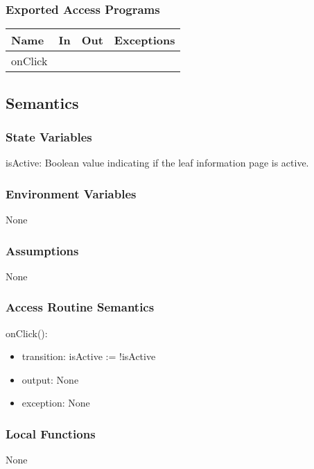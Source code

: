 \documentclass[12pt, titlepage]{article}
\begin{document}
\subsubsection{Exported Access Programs}

\begin{center}
\begin{tabular}{| l | l | l | p{5cm}|}
\hline
\textbf{Name} & \textbf{In} & \textbf{Out} & \textbf{Exceptions} \\
\hline
 onClick&  &  &  \\
\hline
 
\end{tabular}
\end{center}

\subsection{Semantics}

\subsubsection{State Variables}
isActive: Boolean value indicating if the leaf information page is active. 


\subsubsection{Environment Variables}
None
\subsubsection{Assumptions}
None
\subsubsection{Access Routine Semantics}

\noindent onClick():
\begin{itemize}
\item transition: isActive := !isActive
\item output: None
\item exception: None
\end{itemize}


\subsubsection{Local Functions}
None

\newpage
\end{document}
